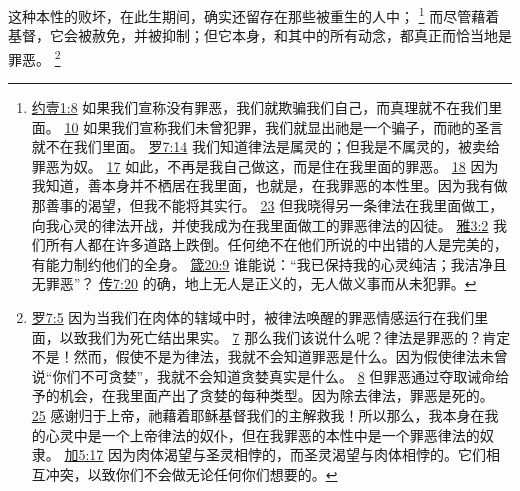 \documentclass[12pt, a4paper, oneside]{ctexart}
\newcounter{parnum}[section]
\newcommand{\N}{%
   \noindent\refstepcounter{parnum}%
    \makebox[\parindent][l]{\textbf{\arabic{parnum}.}}}
\begin{document}
\N 这种本性的败坏，在此生期间，确实还留存在那些被重生的人中；
	\footnote {
		\href{https://biblehub.com/1_john/1-8.htm}{约壹1:8} 如果我们宣称没有罪恶，我们就欺骗我们自己，而真理就不在我们里面。
		\href{https://biblehub.com/1_john/1-10.htm}{10} 如果我们宣称我们未曾犯罪，我们就显出祂是一个骗子，而祂的圣言就不在我们里面。
		\href{https://biblehub.com/romans/7-14.htm}{罗7:14} 我们知道律法是属灵的；但我是不属灵的，被卖给罪恶为奴。
		\href{https://biblehub.com/romans/7-17.htm}{17} 如此，不再是我自己做这，而是住在我里面的罪恶。
        \href{https://biblehub.com/romans/7-18.htm}{18} 因为我知道，善本身并不栖居在我里面，也就是，在我罪恶的本性里。因为我有做那善事的渴望，但我不能将其实行。
		\href{https://biblehub.com/romans/7-23.htm}{23} 但我晓得另一条律法在我里面做工，向我心灵的律法开战，并使我成为在我里面做工的罪恶律法的囚徒。
		\href{https://biblehub.com/james/3-2.htm}{雅3:2} 我们所有人都在许多道路上跌倒。任何绝不在他们所说的中出错的人是完美的，有能力制约他们的全身。
		\href{https://biblehub.com/proverbs/20-9.htm}{箴20:9} 谁能说：“我已保持我的心灵纯洁；我洁净且无罪恶”？
		\href{https://biblehub.com/ecclesiastes/7-20.htm}{传7:20} 的确，地上无人是正义的，无人做义事而从未犯罪。
	}
	而尽管藉着基督，它会被赦免，并被抑制；但它本身，和其中的所有动念，都真正而恰当地是罪恶。
	\footnote {
		\href{https://biblehub.com/romans/7-5.htm}{罗7:5} 因为当我们在肉体的辖域中时，被律法唤醒的罪恶情感运行在我们里面，以致我们为死亡结出果实。
		\href{https://biblehub.com/romans/7-7.htm}{7} 那么我们该说什么呢？律法是罪恶的？肯定不是！然而，假使不是为律法，我就不会知道罪恶是什么。因为假使律法未曾说“你们不可贪婪”，我就不会知道贪婪真实是什么。
		\href{https://biblehub.com/romans/7-8.htm}{8} 但罪恶通过夺取诫命给予的机会，在我里面产出了贪婪的每种类型。因为除去律法，罪恶是死的。
		\href{https://biblehub.com/romans/7-25.htm}{25} 感谢归于上帝，祂藉着耶稣基督我们的主解救我！所以那么，我本身在我的心灵中是一个上帝律法的奴仆，但在我罪恶的本性中是一个罪恶律法的奴隶。
		\href{https://biblehub.com/galatians/5-17.htm}{加5:17} 因为肉体渴望与圣灵相悖的，而圣灵渴望与肉体相悖的。它们相互冲突，以致你们不会做无论任何你们想要的。
	}
\end{document}
